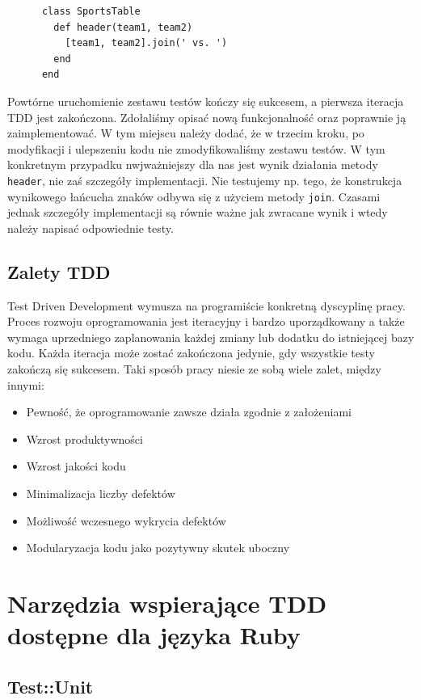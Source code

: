     \begin{verbatim}
      class SportsTable
        def header(team1, team2)
          [team1, team2].join(' vs. ')
        end
      end
    \end{verbatim}
    
  Powtórne uruchomienie zestawu testów kończy się sukcesem, a pierwsza iteracja TDD jest zakończona. Zdołaliśmy opisać nową funkcjonalność oraz poprawnie ją zaimplementować. W tym miejscu należy dodać, że w trzecim kroku, po modyfikacji i ulepszeniu kodu nie zmodyfikowaliśmy zestawu testów. W tym konkretnym przypadku nwjważniejszy dla nas jest wynik działania metody \verb+header+, nie zaś szczegóły implementacji. Nie testujemy np. tego, że konstrukcja wynikowego łańcucha znaków odbywa się z użyciem metody \verb+join+. Czasami jednak szczegóły implementacji są równie ważne jak zwracane wynik i wtedy należy napisać odpowiednie testy.
    
  \subsection{Zalety TDD}
    Test Driven Development wymusza na programiście konkretną dyscyplinę pracy. Proces rozwoju oprogramowania jest iteracyjny i bardzo uporządkowany a także wymaga uprzedniego zaplanowania każdej zmiany lub dodatku do istniejącej bazy kodu. Każda iteracja może zostać zakończona jedynie, gdy wszystkie testy zakończą się sukcesem. Taki sposób pracy niesie ze sobą wiele zalet, między innymi:
     
    \begin{itemize}
      \item Pewność, że oprogramowanie zawsze działa zgodnie z założeniami
      \item Wzrost produktywności
      \item Wzrost jakości kodu
      \item Minimalizacja liczby defektów
      \item Możliwość wczesnego wykrycia defektów
      \item Modularyzacja kodu jako pozytywny skutek uboczny
    \end{itemize}

  \section{Narzędzia wspierające TDD dostępne dla języka Ruby}
    
    \subsection{Test::Unit}
    

